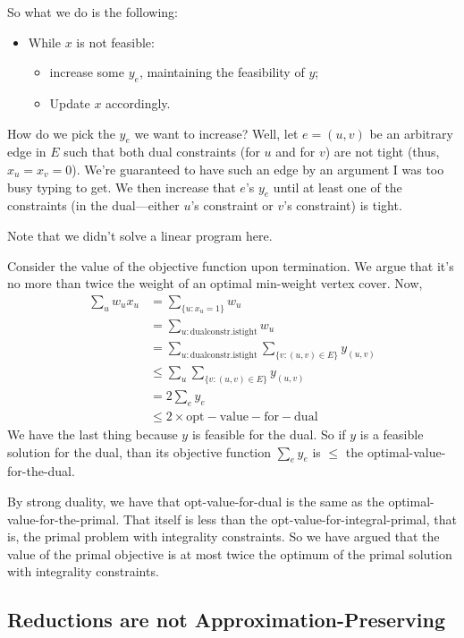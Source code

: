 \documentclass{article}
\begin{document}
So what we do is the following:
\begin{itemize}
	\item While $x$ is not feasible:
	\begin{itemize}
		\item increase some $y_e$, maintaining the feasibility of $y$;
		\item Update $x$ accordingly.
	\end{itemize}
\end{itemize}
How do we pick the $y_e$ we want to increase? Well, let $e = (u,v)$ be
an arbitrary edge in $E$ such that both dual constraints (for $u$ and
for $v$) are not tight (thus, $x_u = x_v = 0$). We're guaranteed to have
such an edge by an argument I was too busy typing to get.
We then increase that $e$'s $y_e$ until at least one of the constraints
(in the dual---either $u$'s constraint or $v$'s constraint) is tight.

Note that we didn't solve a linear program here.

Consider the value of the objective function upon termination. We argue that
it's no more than twice the weight of an optimal min-weight vertex cover.
Now,
\begin{align}
\sum_u w_u x_u
&=
\sum_{\{u : x_u = 1\}}
w_u \\
&=
\sum_{u : \mathrm{dual constr. is tight}}
w_u
\\
&=
\sum_{u : \mathrm{dual constr. is tight}}
\sum_{\{v : (u,v) \in E\}} y_{(u,v)}
\\
&\leq
\sum_u
\sum_{\{v : (u,v) \in E\}} y_{(u,v)}
\\
&=
2\sum_{e} y_e
\\
& \leq 2 \times \mathrm{opt-value-for-dual}
\end{align}
We have the last thing because $y$ is feasible for the dual.
So if $y$ is a feasible solution for the dual, than its objective function
$\sum_e y_e$ is $\leq$ the optimal-value-for-the-dual.

By strong duality, we have that opt-value-for-dual is the same as
the optimal-value-for-the-primal.
That itself is less than the opt-value-for-integral-primal, that is, the
primal problem with integrality constraints.
So we have argued that the value of the primal objective is at most
twice the optimum of the primal solution with integrality constraints.

\subsection{Reductions are not Approximation-Preserving}
\end{document}
